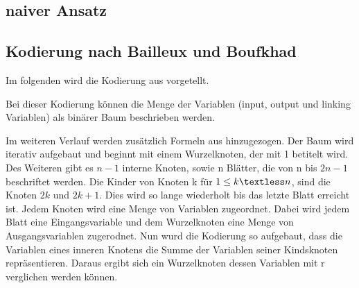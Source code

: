 \documentclass[a4,abstract=on]{scrartcl}
\begin{document}

	\subsection{naiver Ansatz}

	\subsection{Kodierung nach Bailleux und Boufkhad}
Im folgenden wird die Kodierung aus  \cite[][]{bailleux} vorgetellt. 

Bei dieser Kodierung können die Menge der Variablen (input, output und linking Variablen) als binärer Baum beschrieben werden.

Im weiteren Verlauf werden zusätzlich Formeln aus \cite[][]{knuth} hinzugezogen.
Der Baum wird iterativ aufgebaut und beginnt mit einem Wurzelknoten, der mit 1 betitelt wird. Des Weiteren gibt es $n-1$ interne Knoten, sowie n Blätter, die von n bis $2n-1$ beschriftet werden. Die Kinder von Knoten k  für $1 \leq k \textless n$, sind die Knoten $2k$ und $2k +1$. Dies wird so lange wiederholt bis das letzte Blatt erreicht ist.
Jedem Knoten wird eine Menge von Variablen zugeordnet. Dabei wird jedem Blatt eine Eingangsvariable und dem Wurzelknoten eine Menge von Ausgangsvariablen zugerodnet. Nun wurd die Kodierung so aufgebaut, dass die Variablen eines inneren Knotens die Summe der Variablen seiner Kindsknoten repräsentieren. Daraus ergibt sich ein Wurzelknoten dessen Variablen mit r verglichen werden können.\\
\end{document}
